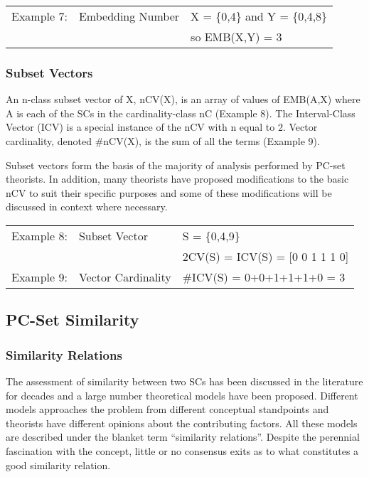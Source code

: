 \documentclass{article}
\begin{document}
\begin{center}
\begin{tabular}{lll}
 Example 7:  &  Embedding Number  &  X = \{0,4\} and Y = \{0,4,8\}  \\
             &                    &  so EMB(X,Y) = 3                \\
\end{tabular}
\end{center}
\subsubsection{Subset Vectors}
\label{sec-3-3-3}

An n-class subset vector of X, nCV(X), is an array of values of
EMB(A,X) where A is each of the SCs in the cardinality-class nC
(Example 8). The Interval-Class Vector (ICV) is a special instance of
the nCV with n equal to 2. Vector cardinality, denoted \#nCV(X), is the
sum of all the terms (Example 9).

Subset vectors form the basis of the majority of analysis performed
by PC-set theorists. In addition, many theorists have proposed
modifications to the basic nCV to suit their specific purposes and
some of these modifications will be discussed in context where
necessary.


\begin{center}
\begin{tabular}{lll}
 Example 8:  &  Subset Vector       &  S = \{0,4,9\}                    \\
             &                      &  2CV(S) = ICV(S) = [0 0 1 1 1 0]  \\
 Example 9:  &  Vector Cardinality  &  \#ICV(S) = 0+0+1+1+1+0 = 3       \\
\end{tabular}
\end{center}
\subsection{PC-Set Similarity}
\label{sec-3-4}
\subsubsection{Similarity Relations}
\label{sec-3-4-1}

The assessment of similarity between two SCs has been discussed in the
literature for decades and a large number theoretical models have been
proposed. Different models approaches the problem from different
conceptual standpoints and theorists have different opinions about the
contributing factors. All these models are described under the blanket
term ``similarity relations''. Despite the perennial fascination with
the concept, little or no consensus exits as to what constitutes a
good similarity relation.
\end{document}
